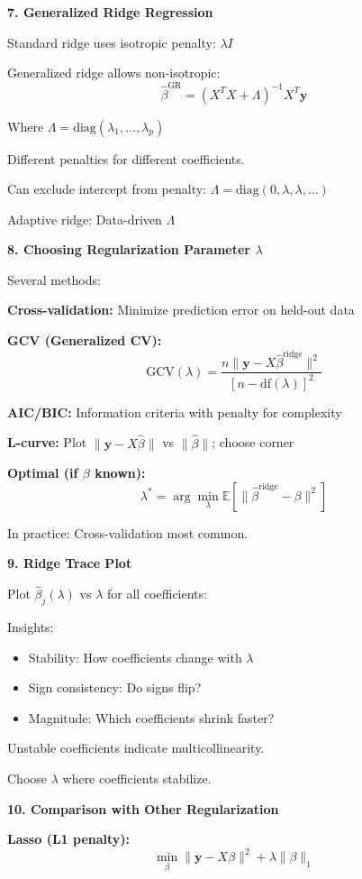 \documentclass[12pt]{article}
\begin{document}
\begin{explanation}
\textbf{7. Generalized Ridge Regression}

Standard ridge uses isotropic penalty: $\lambda I$

Generalized ridge allows non-isotropic:
\[\hat{\beta}^{\text{GR}} = (X^TX + \Lambda)^{-1}X^T\mathbf{y}\]

Where $\Lambda = \text{diag}(\lambda_1, \ldots, \lambda_p)$

Different penalties for different coefficients.

Can exclude intercept from penalty: $\Lambda = \text{diag}(0, \lambda, \lambda, \ldots)$

Adaptive ridge: Data-driven $\Lambda$

\textbf{8. Choosing Regularization Parameter $\lambda$}

Several methods:

\textbf{Cross-validation:} Minimize prediction error on held-out data

\textbf{GCV (Generalized CV):}
\[\text{GCV}(\lambda) = \frac{n\|\mathbf{y} - X\hat{\beta}^{\text{ridge}}\|^2}{[n - \text{df}(\lambda)]^2}\]

\textbf{AIC/BIC:} Information criteria with penalty for complexity

\textbf{L-curve:} Plot $\|\mathbf{y} - X\hat{\beta}\|$ vs $\|\hat{\beta}\|$; choose corner

\textbf{Optimal (if $\beta$ known):}
\[\lambda^* = \arg\min_{\lambda} \mathbb{E}[\|\hat{\beta}^{\text{ridge}} - \beta\|^2]\]

In practice: Cross-validation most common.

\textbf{9. Ridge Trace Plot}

Plot $\hat{\beta}_j(\lambda)$ vs $\lambda$ for all coefficients:

Insights:
\begin{itemize}
\item Stability: How coefficients change with $\lambda$
\item Sign consistency: Do signs flip?
\item Magnitude: Which coefficients shrink faster?
\end{itemize}

Unstable coefficients indicate multicollinearity.

Choose $\lambda$ where coefficients stabilize.

\textbf{10. Comparison with Other Regularization}

\textbf{Lasso (L1 penalty):}
\[\min_{\beta} \|\mathbf{y} - X\beta\|^2 + \lambda \|\beta\|_1\]


\end{explanation}
\end{document}
